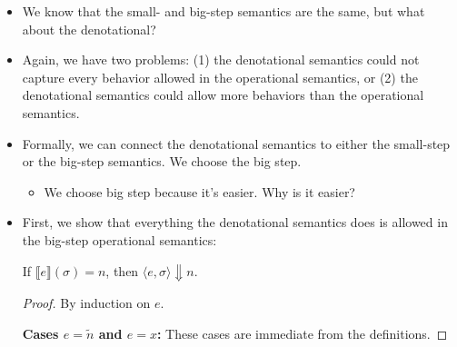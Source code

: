 \documentclass{lecturenotes}
\begin{document}
\begin{itemize}
\item We know that the small- and big-step semantics are the same, but what about the denotational?
\item Again, we have two problems: (1) the denotational semantics could not capture every behavior allowed in the operational semantics, or (2) the denotational semantics could allow more behaviors than the operational semantics.
\item Formally, we can connect the denotational semantics to either the small-step or the big-step semantics.
  We choose the big step.
  \begin{itemize}
  \item We choose big step because it's easier.
    Why is it easier?
  \end{itemize}
\item First, we show that everything the denotational semantics does is allowed in the big-step operational semantics:
  \begin{thm}
    If $\llbracket e \rrbracket(\sigma) = n$, then $\langle e, \sigma \rangle \Downarrow n$.
  \end{thm}
  \begin{proof}
    By induction on $e$.

    \noindent\textbf{Cases $e = \tilde{n}$ and $e = x$:}
    These cases are immediate from the definitions.


\end{proof}
\end{itemize}
\end{document}
